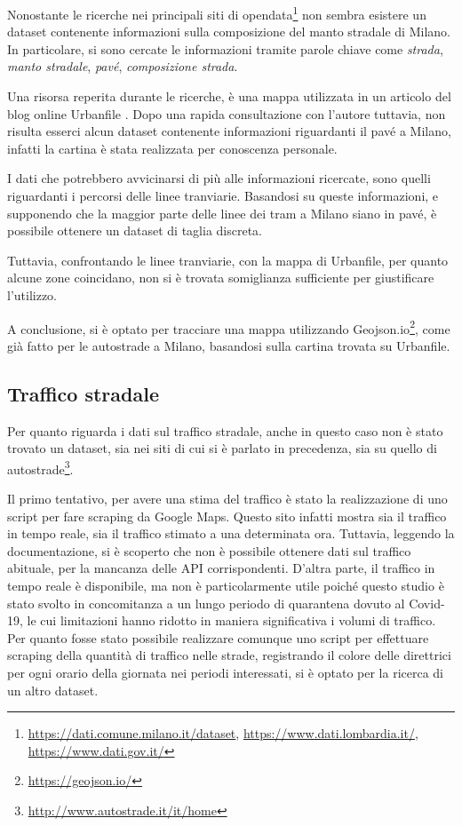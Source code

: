 \documentclass[a4paper,12pt]{report}
\newcommand{\quotestyle}[1]{\textit{#1}}
\begin{document}
Nonostante le ricerche nei principali siti di 
opendata\footnote{
    \url{https://dati.comune.milano.it/dataset}, 
    \url{https://www.dati.lombardia.it/},
    \url{https://www.dati.gov.it/}}
non sembra esistere un dataset contenente informazioni sulla composizione del 
manto stradale di Milano. 
In particolare, si sono cercate le informazioni tramite parole chiave come 
\quotestyle{strada}, \quotestyle{manto stradale}, \quotestyle{pavé}, 
\quotestyle{composizione strada}. 

Una risorsa reperita durante le ricerche, è una mappa utilizzata in un articolo del blog online 
Urbanfile \cite{URBANFILE:1}. 
Dopo una rapida consultazione con l'autore tuttavia, non risulta esserci alcun 
dataset contenente informazioni riguardanti il pavé a Milano, infatti la cartina è 
stata realizzata per conoscenza personale. 

I dati che potrebbero avvicinarsi di più alle informazioni ricercate, 
sono quelli riguardanti i percorsi delle linee tranviarie. 
Basandosi su queste informazioni, e supponendo che la maggior parte delle linee dei 
tram a Milano siano in pavé, è possibile ottenere un dataset di taglia discreta. 

Tuttavia, confrontando le linee tranviarie, con la mappa di Urbanfile, 
per quanto alcune zone coincidano, non si è trovata 
somiglianza sufficiente per giustificare l'utilizzo. 

A conclusione, si è optato per tracciare una mappa utilizzando 
Geojson.io\footnote{\url{https://geojson.io/}}, come già fatto per le autostrade a Milano, 
basandosi sulla cartina trovata su Urbanfile. 

\subsection{Traffico stradale}

Per quanto riguarda i dati sul traffico stradale, anche in questo caso non è stato trovato un 
dataset, sia nei siti di cui si è parlato in precedenza, sia su quello di 
autostrade\footnote{\url{http://www.autostrade.it/it/home}}. 

Il primo tentativo, per avere una stima del traffico è stato la realizzazione di uno 
script per fare scraping da Google Maps. 
Questo sito infatti mostra sia il traffico in tempo reale, sia 
il traffico stimato a una determinata ora. 
Tuttavia, leggendo la documentazione, si è scoperto che non è possibile ottenere 
dati sul traffico abituale, per la mancanza delle API corrispondenti. 
D'altra parte, il traffico in tempo reale è disponibile, ma non è particolarmente utile 
poiché questo studio è stato svolto in concomitanza a un lungo periodo di quarantena 
dovuto al Covid-19, le cui limitazioni hanno ridotto in maniera significativa 
i volumi di traffico. 
Per quanto fosse stato possibile realizzare comunque uno script per effettuare 
scraping della quantità di traffico nelle strade, registrando il colore delle 
direttrici per ogni orario della giornata nei periodi interessati, si è 
optato per la ricerca di un altro dataset. 
\end{document}
